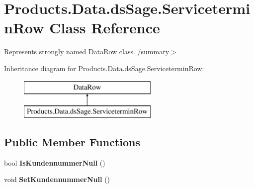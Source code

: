 \hypertarget{class_products_1_1_data_1_1ds_sage_1_1_servicetermin_row}{}\section{Products.\+Data.\+ds\+Sage.\+Servicetermin\+Row Class Reference}
\label{class_products_1_1_data_1_1ds_sage_1_1_servicetermin_row}


Represents strongly named Data\+Row class. /summary$>$  


Inheritance diagram for Products.\+Data.\+ds\+Sage.\+Servicetermin\+Row\+:\begin{figure}[H]
\begin{center}
\leavevmode
\includegraphics[height=2.000000cm]{class_products_1_1_data_1_1ds_sage_1_1_servicetermin_row}
\end{center}
\end{figure}
\subsection*{Public Member Functions}
\begin{DoxyCompactItemize}
\item 
bool {\bfseries Is\+Kundennummer\+Null} ()\hypertarget{class_products_1_1_data_1_1ds_sage_1_1_servicetermin_row_a44ba1988ba2d41fd8ae680564adb4037}{}\label{class_products_1_1_data_1_1ds_sage_1_1_servicetermin_row_a44ba1988ba2d41fd8ae680564adb4037}

\item 
void {\bfseries Set\+Kundennummer\+Null} ()\hypertarget{class_products_1_1_data_1_1ds_sage_1_1_servicetermin_row_ad812d6a5abfb2b0136ec241fd33ec717}{}\label{class_products_1_1_data_1_1ds_sage_1_1_servicetermin_row_ad812d6a5abfb2b0136ec241fd33ec717}

\end{DoxyCompactItemize}
